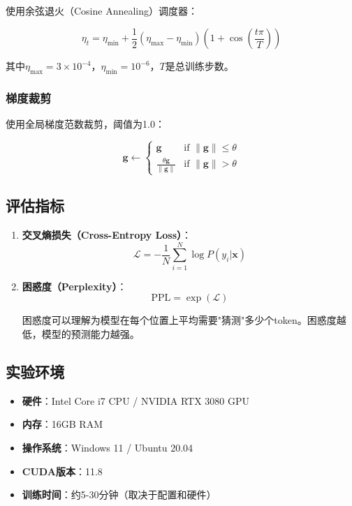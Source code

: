 \documentclass[UTF8,12pt,a4paper]{ctexart}
\begin{document}
使用余弦退火（Cosine Annealing）调度器：

\begin{equation}
\eta_t = \eta_{\text{min}} + \frac{1}{2}(\eta_{\text{max}} - \eta_{\text{min}})(1 + \cos(\frac{t\pi}{T}))
\end{equation}

其中$\eta_{\text{max}} = 3 \times 10^{-4}$，$\eta_{\text{min}} = 10^{-6}$，$T$是总训练步数。

\subsubsection{梯度裁剪}

使用全局梯度范数裁剪，阈值为1.0：

\begin{equation}
\mathbf{g} \leftarrow \begin{cases}
\mathbf{g} & \text{if } \|\mathbf{g}\| \leq \theta \\
\frac{\theta \mathbf{g}}{\|\mathbf{g}\|} & \text{if } \|\mathbf{g}\| > \theta
\end{cases}
\end{equation}

\subsection{评估指标}

\begin{enumerate}
    \item \textbf{交叉熵损失（Cross-Entropy Loss）}：
    \begin{equation}
    \mathcal{L} = -\frac{1}{N}\sum_{i=1}^{N}\log P(y_i | \mathbf{x})
    \end{equation}
    
    \item \textbf{困惑度（Perplexity）}：
    \begin{equation}
    \text{PPL} = \exp(\mathcal{L})
    \end{equation}
    
    困惑度可以理解为模型在每个位置上平均需要"猜测"多少个token。困惑度越低，模型的预测能力越强。
\end{enumerate}

\subsection{实验环境}

\begin{itemize}
    \item \textbf{硬件}：Intel Core i7 CPU / NVIDIA RTX 3080 GPU
    \item \textbf{内存}：16GB RAM
    \item \textbf{操作系统}：Windows 11 / Ubuntu 20.04
    \item \textbf{CUDA版本}：11.8
    \item \textbf{训练时间}：约5-30分钟（取决于配置和硬件）
\end{itemize}
\end{document}
